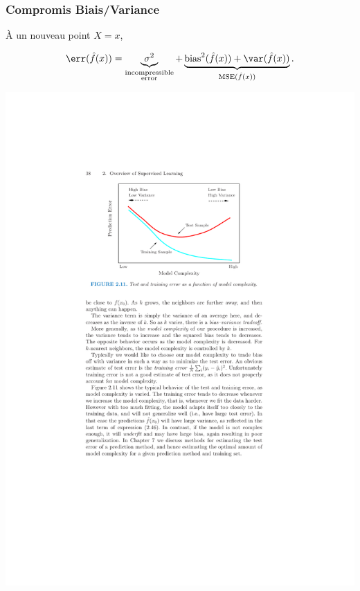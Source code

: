 \documentclass{beamer}\usepackage[]{graphicx}\usepackage[]{color}
\begin{document}
\begin{frame}
  \frametitle{Compromis Biais/Variance}

  À un nouveau point $X=x$,
  \begin{overlayarea}{\textwidth}{\textheight}
    \begin{equation*}
      \err(\hat{f}(x))                =
      \underbrace{\sigma^2}_{\substack{\text{incompressible}\\\text{error}}}
      +
      \underbrace{\text{bias}^2(\hat{f}(x))                    +
        \var(\hat{f}(x))}_{\mathrm{MSE}(\hat{f}(x))}.
    \end{equation*}

    \begin{center}
      \includegraphics[width=.7\textwidth]{figures/tradeoff}
    \end{center}
  \end{overlayarea}

\end{frame}
\end{document}
